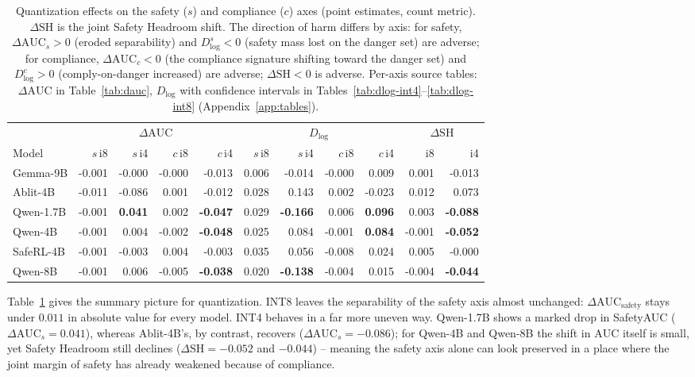\documentclass[10pt,twocolumn]{article}
\newcommand{\AUC}{\mathrm{AUC}}
\newcommand{\Dlog}{D_{\log}}
\newcommand{\SH}{\mathrm{SH}}
\begin{document}
\begin{table}[tp]
\centering\small
\setlength{\tabcolsep}{5pt}
\caption{Quantization effects on the safety ($s$) and compliance ($c$) axes (point
estimates, count metric). $\Delta\SH$ is the joint Safety Headroom shift. The direction of
harm differs by axis: for safety, $\Delta\AUC_s>0$ (eroded separability) and $\Dlog^{s}<0$
(safety mass lost on the danger set) are adverse; for compliance, $\Delta\AUC_c<0$ (the
compliance signature shifting toward the danger set) and $\Dlog^{c}>0$ (comply-on-danger
increased) are adverse; $\Delta\SH<0$ is adverse. Per-axis source tables: $\Delta\AUC$ in Table~\ref{tab:dauc}, $\Dlog$ with
confidence intervals in Tables~\ref{tab:dlog-int4}--\ref{tab:dlog-int8}
(Appendix~\ref{app:tables}).}
\label{tab:quant-summary}
\begin{tabular}{@{}lrrrrrrrrrr@{}}
\toprule
& \multicolumn{4}{c}{$\Delta\AUC$} & \multicolumn{4}{c}{$\Dlog$} & \multicolumn{2}{c}{$\Delta\SH$} \\
\cmidrule(lr){2-5}\cmidrule(lr){6-9}\cmidrule(lr){10-11}
Model & $s$\,i8 & $s$\,i4 & $c$\,i8 & $c$\,i4 & $s$\,i8 & $s$\,i4 & $c$\,i8 & $c$\,i4 & i8 & i4 \\
\midrule
Gemma-9B  & -0.001 & -0.000 & -0.000 & -0.013 &  0.006 & -0.014 & -0.000 &  0.009 &  0.001 & -0.013 \\
Ablit-4B  & -0.011 & -0.086 &  0.001 & -0.012 &  0.028 &  0.143 &  0.002 & -0.023 &  0.012 &  0.073 \\
Qwen-1.7B & -0.001 & \textbf{0.041} &  0.002 & \textbf{-0.047} &  0.029 & \textbf{-0.166} &  0.006 & \textbf{0.096} &  0.003 & \textbf{-0.088} \\
Qwen-4B   & -0.001 &  0.004 & -0.002 & \textbf{-0.048} &  0.025 &  0.084 & -0.001 & \textbf{0.084} & -0.001 & \textbf{-0.052} \\
SafeRL-4B & -0.001 & -0.003 &  0.004 & -0.003 &  0.035 &  0.056 & -0.008 &  0.024 &  0.005 & -0.000 \\
Qwen-8B   & -0.001 &  0.006 & -0.005 & \textbf{-0.038} &  0.020 & \textbf{-0.138} & -0.004 &  0.015 & -0.004 & \textbf{-0.044} \\
\bottomrule
\end{tabular}
\end{table}

Table~\ref{tab:quant-summary} gives the summary picture for quantization. INT8 leaves the
separability of the safety axis almost unchanged: $\Delta\AUC_{\mathrm{safety}}$ stays under
$0.011$ in absolute value for every model. INT4 behaves in a far more uneven way. Qwen-1.7B shows a marked drop in
SafetyAUC ($\Delta\AUC_s=0.041$), whereas Ablit-4B's, by contrast, recovers
($\Delta\AUC_s=-0.086$); for Qwen-4B and Qwen-8B the shift in $\AUC$ itself is small, yet Safety Headroom still declines ($\Delta\SH=-0.052$ and $-0.044$)
-- meaning the safety axis alone can look preserved in a place where the joint margin
of safety has already weakened because of compliance.
\end{document}
